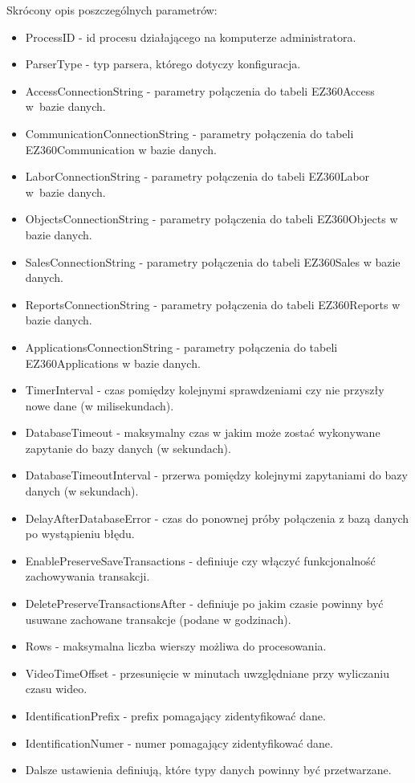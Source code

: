 \documentclass[a4paper]{book}
\begin{document}
Skrócony opis poszczególnych parametrów:
\begin{itemize}
	\setlength\itemsep{0.1pt}
	\item ProcessID - id procesu działającego na komputerze administratora.
	\item ParserType - typ parsera, którego dotyczy konfiguracja.
	\item AccessConnectionString - parametry połączenia do tabeli EZ360Access w~bazie danych.
	\item CommunicationConnectionString - parametry połączenia do tabeli EZ360Communication w bazie danych.
	\item LaborConnectionString - parametry połączenia do tabeli EZ360Labor w~bazie danych.
	\item ObjectsConnectionString - parametry połączenia do tabeli EZ360Objects w bazie danych.
	\item SalesConnectionString - parametry połączenia do tabeli EZ360Sales w bazie danych.
	\item ReportsConnectionString - parametry połączenia do tabeli EZ360Reports w bazie danych.
	\item ApplicationsConnectionString - parametry połączenia do tabeli EZ360Applications w bazie danych.
	\item TimerInterval - czas pomiędzy kolejnymi sprawdzeniami czy nie przyszły nowe dane (w milisekundach).
	\item DatabaseTimeout - maksymalny czas w jakim może zostać wykonywane zapytanie do bazy danych (w sekundach).
	\item DatabaseTimeoutInterval - przerwa pomiędzy kolejnymi zapytaniami do bazy danych (w sekundach).
	\item DelayAfterDatabaseError - czas do ponownej próby połączenia z bazą danych po wystąpieniu błędu.
	\item EnablePreserveSaveTransactions - definiuje czy włączyć funkcjonalność zachowywania transakcji.
	\item DeletePreserveTransactionsAfter - definiuje po jakim czasie powinny być usuwane zachowane transakcje (podane w godzinach).
	\item Rows - maksymalna liczba wierszy możliwa do procesowania.
	\item VideoTimeOffset - przesunięcie w minutach uwzględniane przy wyliczaniu czasu wideo.
	\item IdentificationPrefix - prefix pomagający zidentyfikować dane.
	\item IdentificationNumer - numer pomagający zidentyfikować dane.
	\item Dalsze ustawienia definiują, które typy danych powinny być przetwarzane.
\end{itemize}
\end{document}
